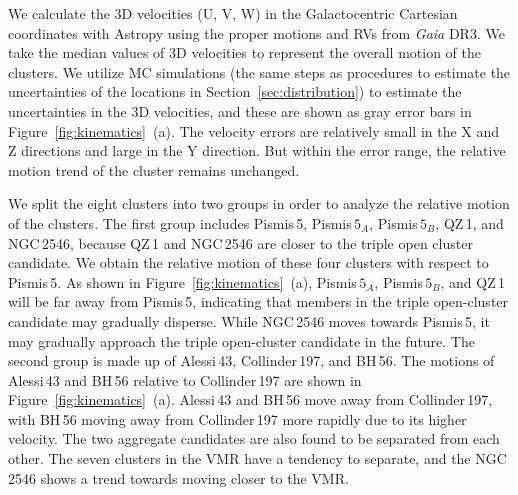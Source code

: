 \documentclass{aa} %
\begin{document}


We calculate the 3D velocities (U, V, W) in the Galactocentric Cartesian coordinates with 
Astropy using the proper motions and RVs from {\it Gaia} DR3. We take the median values of 
3D velocities to represent the overall motion of the clusters. We utilize MC simulations (the same steps as procedures to estimate the uncertainties of the 
locations in Section~\ref{sec:distribution}) to estimate the uncertainties in the 3D velocities, and these are 
shown as gray error bars in Figure~\ref{fig:kinematics}~(a).
The velocity errors are relatively small in the X and Z directions 
and large in the Y direction. But within the error range, the relative motion trend of the cluster 
remains unchanged. 


We split the eight clusters into two groups 
in order to analyze the relative motion of the clusters. The first group includes Pismis\,5, 
Pismis$\,5_{A}$, Pismis$\,5_{B}$, QZ\,1, and NGC\,2546, because QZ\,1 and NGC\,2546 are closer 
to the triple open cluster candidate. We obtain the relative motion of these four clusters with respect to Pismis\,5.
As shown in Figure~\ref{fig:kinematics}~(a), Pismis$\,5_{A}$, Pismis$\,5_{B}$, and 
QZ\,1 will be far away from Pismis\,5, indicating that members in the triple open-cluster candidate may 
gradually disperse. While NGC\,2546 moves towards Pismis\,5, it may gradually approach the triple open-cluster candidate in the future. 
The second group is made up of Alessi\,43, Collinder\,197, and BH\,56. The motions of Alessi\,43 and
BH\,56 relative to Collinder\,197 are shown in Figure~\ref{fig:kinematics}~(a). Alessi\,43 and BH\,56 
move away from Collinder\,197, with BH\,56 moving away from Collinder\,197 more rapidly due 
to its higher velocity. The two aggregate candidates are also found to be separated from each other. The seven clusters in the VMR have a tendency to separate, and the NGC\,2546 shows a trend towards moving closer to the VMR.
\end{document}
